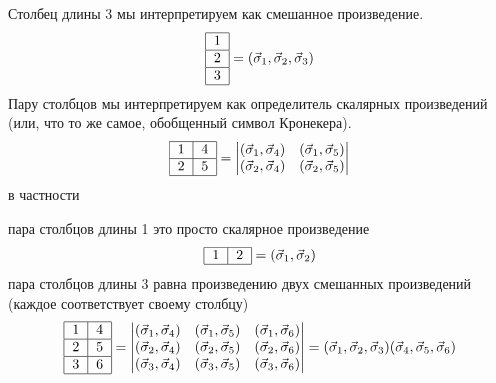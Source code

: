 \documentclass[]{article}
\begin{document}
Столбец длины 3 мы интерпретируем как смешанное произведение.
$$ \begin{tabular}{ | l | }
\hline
1 \\ \hline
2 \\ \hline
3 \\
\hline
\end{tabular} = (\vec \sigma_1, \vec \sigma_2, \vec \sigma_3) $$
Пару столбцов мы интерпретируем как определитель скалярных произведений (или, что то же самое, обобщенный символ Кронекера).
$$ \begin{tabular}{ |l|l| }
\hline
1 & 4 \\ \hline
2 & 5\\ 
\hline
\end{tabular}
 = 
\begin{vmatrix}
(\vec\sigma_1,\vec\sigma_4) & (\vec\sigma_1,\vec\sigma_5)\\
(\vec\sigma_2,\vec\sigma_4) & (\vec\sigma_2,\vec\sigma_5)\\
\end{vmatrix}
$$
в частности

пара столбцов длины 1 это просто скалярное произведение
$$\begin{tabular}{ |l|l| }
\hline
1 & 2 \\
\hline
\end{tabular}
= (\vec \sigma_1, \vec \sigma_2)
$$
пара столбцов длины 3 равна произведению двух смешанных произведений (каждое соответствует  своему столбцу)
$$ \begin{tabular}{ |l|l| }
\hline
1 & 4 \\ \hline
2 & 5\\ \hline
3 & 6\\
\hline
\end{tabular}
= 
\begin{vmatrix}
(\vec\sigma_1,\vec\sigma_4) & (\vec\sigma_1,\vec\sigma_5) & (\vec\sigma_1,\vec\sigma_6) \\
(\vec\sigma_2,\vec\sigma_4) & (\vec\sigma_2,\vec\sigma_5) & (\vec\sigma_2,\vec\sigma_6) \\
(\vec\sigma_3,\vec\sigma_4) & (\vec\sigma_3,\vec\sigma_5) & (\vec\sigma_3,\vec\sigma_6) \\
\end{vmatrix}
=
(\vec \sigma_1, \vec \sigma_2, \vec \sigma_3)
(\vec \sigma_4, \vec \sigma_5, \vec \sigma_6)
$$
\end{document}
